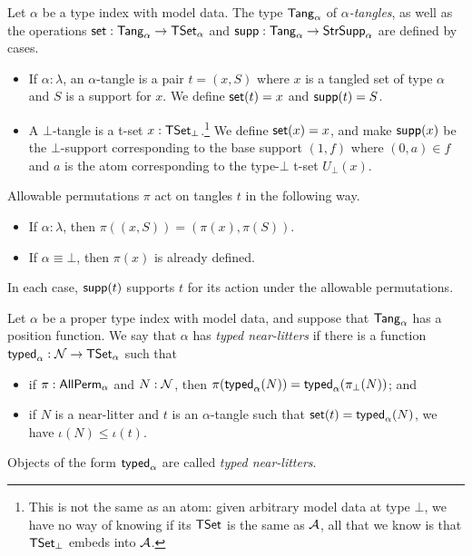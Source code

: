 \begin{definition}[tangle]
  \label{def:Tangle}
  Let \( \alpha \) be a type index with model data.
  The type \( \mathsf{Tang}_\alpha \) of \emph{\( \alpha \)-tangles}, as well as the operations \( \operatorname{\mathsf{set}} : \mathsf{Tang}_\alpha \to \mathsf{TSet}_\alpha \) and \( \operatorname{\mathsf{supp}} : \mathsf{Tang}_\alpha \to \mathsf{StrSupp}_\alpha \) are defined by cases.
  \begin{itemize}
    \item If \( \alpha : \lambda \), an \( \alpha \)-tangle is a pair \( t = (x, S) \) where \( x \) is a tangled set of type \( \alpha \) and \( S \) is a support for \( x \).
    We define \( \operatorname{\mathsf{set}}(t) = x \) and \( \operatorname{\mathsf{supp}}(t) = S \).
    \item A \( \bot \)-tangle is a t-set \( x : \mathsf{TSet}_\bot \).\footnote{This is not the same as an atom: given arbitrary model data at type \( \bot \), we have no way of knowing if its \( \mathsf{TSet} \) is the same as \( {\mathcal A} \), all that we know is that \( \mathsf{TSet}_\bot \) embeds into \( {\mathcal A} \).}
    We define \( \operatorname{\mathsf{set}}(x) = x \), and make \( \operatorname{\mathsf{supp}}(x) \) be the \( \bot \)-support corresponding to the base support \( (1, f) \) where \( (0, a) \in f \) and \( a \) is the atom corresponding to the type-\( \bot \) t-set \( U_\bot(x)\).
  \end{itemize}
  Allowable permutations \( \pi \) act on tangles \( t \) in the following way.
  \begin{itemize}
    \item If \( \alpha : \lambda \), then \( \pi((x, S)) = (\pi(x), \pi(S)) \).
    \item If \( \alpha \equiv \bot \), then \( \pi(x) \) is already defined.
  \end{itemize}
  In each case, \( \operatorname{\mathsf{supp}}(t) \) supports \( t \) for its action under the allowable permutations.
\end{definition}
\begin{definition}
  \label{def:TypedNearLitter}
  Let \( \alpha \) be a proper type index with model data, and suppose that \( \mathsf{Tang}_\alpha \) has a position function.
  We say that \( \alpha \) has \emph{typed near-litters} if there is a function \( \operatorname{\mathsf{typed}}_\alpha : {\mathcal N} \to \mathsf{TSet}_\alpha \) such that
  \begin{itemize}
    \item if \( \pi : \mathsf{AllPerm}_\alpha \) and \( N : {\mathcal N} \), then \( \pi(\operatorname{\mathsf{typed}}_\alpha(N)) = \operatorname{\mathsf{typed}}_\alpha(\pi_\bot(N)) \); and
    \item if \( N \) is a near-litter and \( t \) is an \( \alpha \)-tangle such that \( \operatorname{\mathsf{set}}(t) = \operatorname{\mathsf{typed}}_\alpha(N) \), we have \( \iota(N) \leq \iota(t) \).
  \end{itemize}
  Objects of the form \( \operatorname{\mathsf{typed}}_\alpha \) are called \emph{typed near-litters}.
\end{definition}
